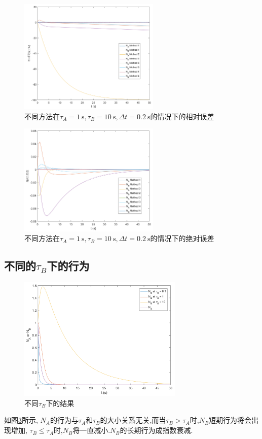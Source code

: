 \documentclass[UTF-8]{article}
\begin{document}
\begin{figure}[h]
	\centering
	\includegraphics[width=0.6\textwidth]{Q_3_2.png}
	\caption{不同方法在$\tau_{A}=\SI{1}{\second}, \tau_{B}=\SI{10}{\second}, \Delta t=\SI{0.2}{\second}$的情况下的相对误差}
	\label{fig:Q-3-2}
\end{figure}
\begin{figure}[h]
	\centering
	\includegraphics[width=0.6\textwidth]{Q_3_3.png}
	\caption{不同方法在$\tau_{A}=\SI{1}{\second}, \tau_{B}=\SI{10}{\second}, \Delta t=\SI{0.2}{\second}$的情况下的绝对误差}
	\label{fig:Q-3-3}
\end{figure}

\subsection{不同的$\tau_{B}$下的行为}
\begin{figure}[h]
	\centering
	\includegraphics[width=0.7\textwidth]{Q_3_4.png}
	\caption{不同$\tau_{B}$下的结果}
	\label{fig:Q-3-4}
\end{figure}
如图\ref{fig:Q-3-4}所示, $N_A$的行为与$\tau_A$和$\tau_{B}$的大小关系无关,而当$\tau_{B}>\tau_{A}$时,$N_B$短期行为将会出现增加, $\tau_{B}\leqslant\tau_{A}$时,$N_B$将一直减小.$N_B$的长期行为成指数衰减.
\end{document}
